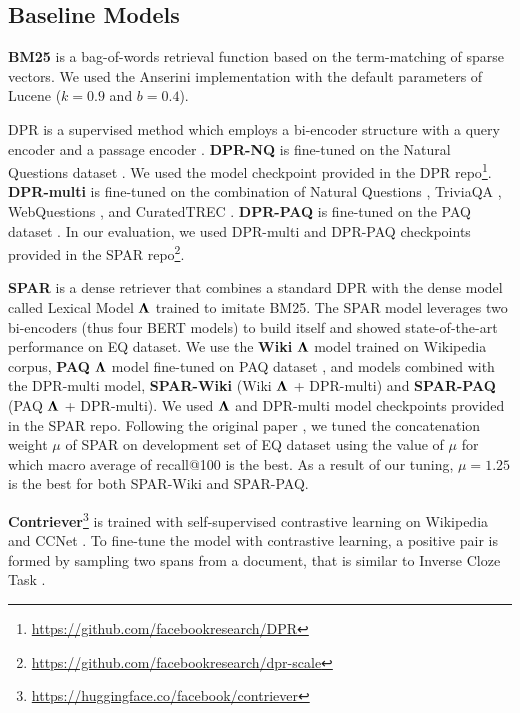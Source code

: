 \documentclass[letterpaper]{article} %
\begin{document}
\subsection{Baseline Models}
\textbf{BM25} \citep{robertson2009probabilistic} is a bag-of-words retrieval function based on the term-matching of sparse vectors.
We used the Anserini \citep{anserini_Yang0L17} implementation with the default parameters of Lucene ($k = 0.9$ and $b = 0.4$).

DPR is a supervised method which employs a bi-encoder structure with a query encoder and a passage encoder \citep{karpukhin-etal-2020-dense}.
\textbf{DPR-NQ} is fine-tuned on the Natural Questions dataset \citep{kwiatkowski-etal-2019-natural}.
We used the model checkpoint provided in the DPR repo\footnote{\url{https://github.com/facebookresearch/DPR}}.
\textbf{DPR-multi} is fine-tuned on the combination of Natural Questions \citep{kwiatkowski-etal-2019-natural}, TriviaQA \citep{joshi-etal-2017-triviaqa}, WebQuestions \citep{berant-etal-2013-semantic}, and CuratedTREC \citep{curatedtrec}.
\textbf{DPR-PAQ} is fine-tuned on the PAQ dataset \citep{lewis-etal-2021-paq}.
In our evaluation, we used DPR-multi and DPR-PAQ checkpoints provided in the SPAR repo\footnote{\url{https://github.com/facebookresearch/dpr-scale}}.

\textbf{SPAR} \citep{Chen2021SalientPA} is a dense retriever that combines a standard DPR with the dense model called Lexical Model $\bf{\Lambda}$ trained to imitate BM25.
The SPAR model leverages two bi-encoders (thus four BERT models) to build itself and showed state-of-the-art performance on EQ dataset.
We use the \textbf{Wiki} $\bf{\Lambda}$ model trained on Wikipedia corpus, \textbf{PAQ} $\bf{\Lambda}$ model fine-tuned on PAQ dataset \citep{lewis-etal-2021-paq}, and models combined with the DPR-multi model, \textbf{SPAR-Wiki} (Wiki $\bf{\Lambda}$ + DPR-multi) and \textbf{SPAR-PAQ} (PAQ $\bf{\Lambda}$ + DPR-multi).
We used $\bf{\Lambda}$ and DPR-multi model checkpoints provided in the SPAR repo.
Following the original paper \citep{Chen2021SalientPA}, we tuned the concatenation weight $\mu$ of SPAR on development set of EQ dataset using the value of $\mu$ for which macro average of recall@100 is the best.
As a result of our tuning, $\mu = 1.25$ is the best for both SPAR-Wiki and SPAR-PAQ.

\textbf{Contriever}\footnote{\url{https://huggingface.co/facebook/contriever}} \citep{contriever} is trained with self-supervised contrastive learning on Wikipedia and CCNet \citep{wenzek-etal-2020-ccnet}.
To fine-tune the model with contrastive learning, a positive pair is formed by sampling two spans from a document, that is similar to Inverse Cloze Task \citep{lee-etal-2019-latent}.
\end{document}
